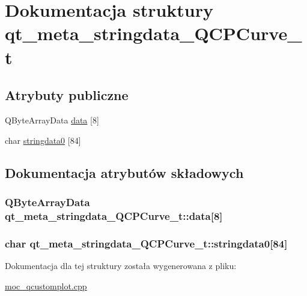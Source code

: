 \hypertarget{structqt__meta__stringdata___q_c_p_curve__t}{}\section{Dokumentacja struktury qt\+\_\+meta\+\_\+stringdata\+\_\+\+Q\+C\+P\+Curve\+\_\+t}
\label{structqt__meta__stringdata___q_c_p_curve__t}
\subsection*{Atrybuty publiczne}
\begin{DoxyCompactItemize}
\item 
Q\+Byte\+Array\+Data \hyperlink{structqt__meta__stringdata___q_c_p_curve__t_a7398cd60d68a5b116f4a9337e17df11d}{data} \mbox{[}8\mbox{]}
\item 
char \hyperlink{structqt__meta__stringdata___q_c_p_curve__t_a48e3deecb80ff42a459075e2246e712f}{stringdata0} \mbox{[}84\mbox{]}
\end{DoxyCompactItemize}


\subsection{Dokumentacja atrybutów składowych}
\subsubsection[{\texorpdfstring{data}{data}}]{\setlength{\rightskip}{0pt plus 5cm}Q\+Byte\+Array\+Data qt\+\_\+meta\+\_\+stringdata\+\_\+\+Q\+C\+P\+Curve\+\_\+t\+::data\mbox{[}8\mbox{]}}\hypertarget{structqt__meta__stringdata___q_c_p_curve__t_a7398cd60d68a5b116f4a9337e17df11d}{}\label{structqt__meta__stringdata___q_c_p_curve__t_a7398cd60d68a5b116f4a9337e17df11d}
\subsubsection[{\texorpdfstring{stringdata0}{stringdata0}}]{\setlength{\rightskip}{0pt plus 5cm}char qt\+\_\+meta\+\_\+stringdata\+\_\+\+Q\+C\+P\+Curve\+\_\+t\+::stringdata0\mbox{[}84\mbox{]}}\hypertarget{structqt__meta__stringdata___q_c_p_curve__t_a48e3deecb80ff42a459075e2246e712f}{}\label{structqt__meta__stringdata___q_c_p_curve__t_a48e3deecb80ff42a459075e2246e712f}


Dokumentacja dla tej struktury została wygenerowana z pliku\+:\begin{DoxyCompactItemize}
\item 
\hyperlink{moc__qcustomplot_8cpp}{moc\+\_\+qcustomplot.\+cpp}\end{DoxyCompactItemize}
